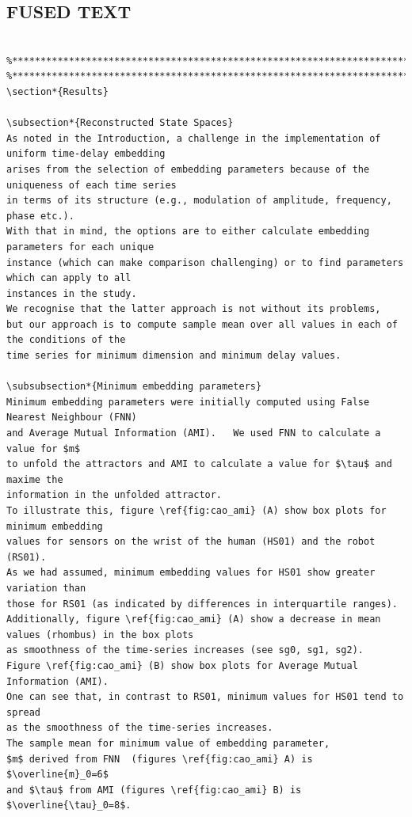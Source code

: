 \documentclass[10pt]{article}
\begin{document}
\subsection{FUSED TEXT}
\begin{verbatim}

%*******************************************************************************
%*******************************************************************************
\section*{Results}

\subsection*{Reconstructed State Spaces}
As noted in the Introduction, a challenge in the implementation of uniform time-delay embedding 
arises from the selection of embedding parameters because of the uniqueness of each time series 
in terms of its structure (e.g., modulation of amplitude, frequency, phase etc.). 
With that in mind, the options are to either calculate embedding parameters for each unique 
instance (which can make comparison challenging) or to find parameters which can apply to all 
instances in the study.
We recognise that the latter approach is not without its problems, 
but our approach is to compute sample mean over all values in each of the conditions of the 
time series for minimum dimension and minimum delay values.

\subsubsection*{Minimum embedding parameters}
Minimum embedding parameters were initially computed using False Nearest Neighbour (FNN) 
and Average Mutual Information (AMI).   We used FNN to calculate a value for $m$
to unfold the attractors and AMI to calculate a value for $\tau$ and maxime the 
information in the unfolded attractor.
To illustrate this, figure \ref{fig:cao_ami} (A) show box plots for minimum embedding 
values for sensors on the wrist of the human (HS01) and the robot (RS01).   
As we had assumed, minimum embedding values for HS01 show greater variation than 
those for RS01 (as indicated by differences in interquartile ranges).  
Additionally, figure \ref{fig:cao_ami} (A) show a decrease in mean values (rhombus) in the box plots 
as smoothness of the time-series increases (see sg0, sg1, sg2).  
Figure \ref{fig:cao_ami} (B) show box plots for Average Mutual Information (AMI).  
One can see that, in contrast to RS01, minimum values for HS01 tend to spread 
as the smoothness of the time-series increases.
The sample mean for minimum value of embedding parameter, 
$m$ derived from FNN  (figures \ref{fig:cao_ami} A) is $\overline{m}_0=6$ 
and $\tau$ from AMI (figures \ref{fig:cao_ami} B) is $\overline{\tau}_0=8$.


\end{verbatim}
\end{document}
